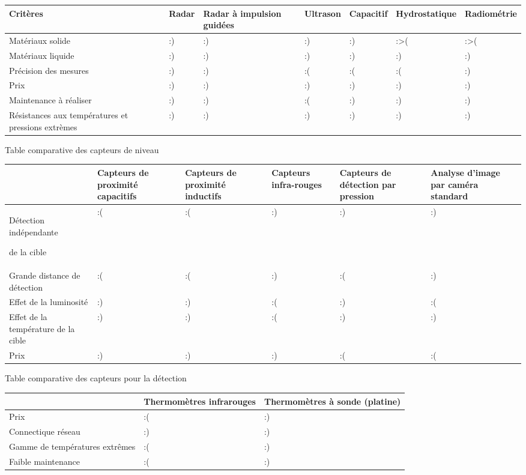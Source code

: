 \documentclass{article}
\begin{document}
\begin{flushleft}
\tablehead{}
\begin{supertabular}{|m{2.71cm}|m{1.308cm}|m{2.155cm}|m{1.8109999cm}|m{1.8369999cm}|m{2.816cm}|m{2.508cm}|}
\hline
Critères &
Radar &
Radar à impulsion guidées &
Ultrason &
Capacitif &
Hydrostatique &
Radiométrie\\\hline
Matériaux solide &
:) &
:) &
:) &
:) &
:{\textgreater}( &
:{\textgreater}(\\\hline
Matériaux liquide &
:) &
:) &
:) &
:) &
:) &
:)\\\hline
Précision des mesures &
:) &
:) &
:( &
:( &
:( &
:)\\\hline
Prix &
:) &
:) &
:) &
:) &
:) &
:)\\\hline
Maintenance à réaliser &
:) &
:) &
:( &
:) &
:) &
:)\\\hline
Résistances aux températures et pressions extrèmes &
:) &
:) &
:) &
:) &
:) &
:)\\\hline
\end{supertabular}
\end{flushleft}

Table comparative des capteurs de niveau

\begin{flushleft}
\tablehead{}
\begin{supertabular}{|m{2.843cm}|m{2.261cm}|m{2.552cm}|m{2.552cm}|m{2.552cm}|m{2.587cm}|}
\hline
~
 &
Capteurs de proximité capacitifs &
Capteurs de proximité inductifs &
Capteurs infra-rouges &
Capteurs de détection par pression &
Analyse d’image par caméra standard\\\hline
Détection indépendante 

 de la cible &
:( &
:( &
:) &
:) &
:)\\\hline
Grande distance de détection  &
:( &
:( &
:) &
:( &
:)\\\hline
Effet de la luminosité &
:) &
:) &
:( &
:) &
:(\\\hline
Effet de la température de la cible &
:) &
:) &
:( &
:) &
:)\\\hline
Prix &
:) &
:) &
:) &
:( &
:(\\\hline
\end{supertabular}
\end{flushleft}

Table comparative des capteurs pour la détection

\begin{flushleft}
\tablehead{}
\begin{supertabular}{|m{5.303cm}|m{5.303cm}|m{5.339cm}|}
\hline
~
 &
Thermomètres infrarouges &
Thermomètres à sonde (platine)\\\hline
Prix &
:( &
:)\\\hline
Connectique réseau &
:) &
:)\\\hline
Gamme de températures extrêmes &
:( &
:)\\\hline
Faible maintenance &
:( &
:)\\\hline
\end{supertabular}
\end{flushleft}
\end{document}
